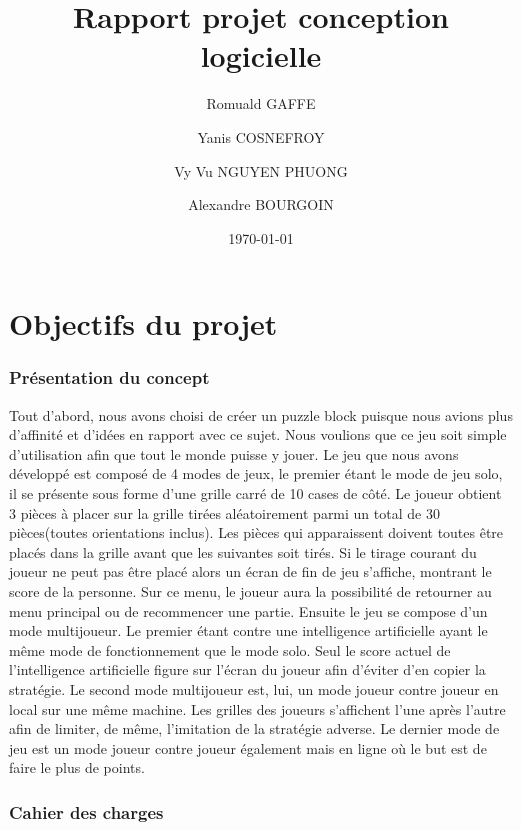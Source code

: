 \documentclass[]{report}
\title{Rapport projet conception logicielle}
\author{Romuald GAFFE\and Yanis COSNEFROY\and Vy Vu NGUYEN PHUONG\and Alexandre BOURGOIN}
\date{\today}
\begin{document}
\maketitle 
\tableofcontents
\part{Objectifs du projet}
\section{Présentation du concept}
Tout d'abord, nous avons choisi de créer un puzzle block puisque nous avions plus d'affinité et d'idées en rapport avec ce sujet. Nous voulions que ce jeu soit simple d'utilisation afin que tout le monde puisse y jouer. Le jeu que nous avons développé est composé de 4 modes de jeux, le premier étant le mode de jeu solo, il se présente sous forme d'une grille carré de 10 cases de côté. Le joueur obtient 3 pièces à placer sur la grille tirées aléatoirement parmi un total de 30 pièces(toutes orientations inclus). Les pièces qui apparaissent doivent toutes être placés dans la grille avant que les suivantes soit tirés. Si le tirage courant du joueur ne peut pas être placé alors un écran de fin de jeu s'affiche, montrant le score de la personne. Sur ce menu, le joueur aura la possibilité de retourner au menu principal ou de recommencer une partie. Ensuite le jeu se compose d'un mode multijoueur. Le premier étant contre une intelligence artificielle ayant le même mode de fonctionnement que le mode solo. Seul le score actuel de l'intelligence artificielle figure sur l'écran du joueur afin d'éviter d'en copier la stratégie. Le second mode multijoueur est, lui, un mode joueur contre joueur en local sur une même machine. Les grilles des joueurs s'affichent l'une après l'autre afin de limiter, de même, l'imitation de la stratégie adverse. Le dernier mode de jeu est un mode joueur contre joueur également mais en ligne où le but est de faire le plus de points.

\section{Cahier des charges}
\end{document}
